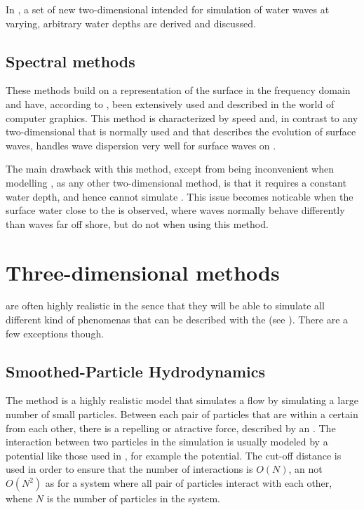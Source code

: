 In , a set of new two-dimensional \PDEs intended for simulation of water waves at varying, arbitrary water depths are derived and discussed.

\subsection{Spectral methods}

These methods build on  a representation of the surface in the frequency domain and have, according to \citep{Monnier}, been extensively used and described in the world of computer graphics. This method is characterized by speed and, in contrast to any two-dimensional \PDE that is normally used and that describes the evolution of surface waves, handles wave dispersion very well for surface waves on .

The main drawback with this method, except from being inconvenient when modelling \FSI, as any other two-dimensional \CFD method, is that it requires a constant water depth, and hence cannot simulate . This issue becomes noticable when the surface water close to the  is observed, where waves normally behave differently than waves far off shore, but do not when using this method.

\section{Three-dimensional methods}

 are often highly realistic in the sence that they will be able to simulate all different kind of phenomenas that can be described with the  (see ). There are a few exceptions though.

\subsection{Smoothed-Particle Hydrodynamics}

The \SPH method is a highly realistic model that simulates a flow by simulating a large number of small particles. Between each pair of particles that are within a certain  from each other, there is a repelling or atractive force, described by an \ODE. The interaction between two particles in the simulation is usually modeled by a potential like those used in \MD, for example the \LJ potential. The cut-off distance is used in order to ensure that the number of interactions is $O(N)$, an not $O(N^2)$ as for a system where all pair of particles interact with each other, whene $N$ is the number of particles in the system.

